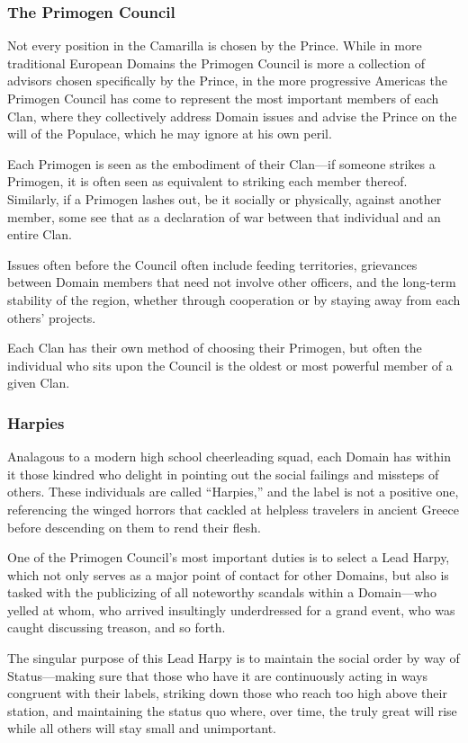\subsubsection{The Primogen Council}
Not every position in the Camarilla is chosen by the Prince.  While in more traditional 
European Domains the Primogen Council is more a collection of advisors chosen specifically 
by the Prince, in the more progressive Americas the Primogen Council has come to represent 
the most important members of each Clan, where they collectively address Domain issues and 
advise the Prince on the will of the Populace, which he may ignore at his own peril.

Each Primogen is seen as the embodiment of their Clan---if someone strikes a Primogen, it is 
often seen as equivalent to striking each member thereof.  Similarly, if a Primogen lashes out, 
be it socially or physically, against another member, some see that as a declaration of war 
between that individual and an entire Clan.

Issues often before the Council often include feeding territories, grievances between Domain 
members that need not involve other officers, and the long-term stability of the region, whether 
through cooperation or by staying away from each others' projects.

Each Clan has their own method of choosing their Primogen, but often the individual who sits 
upon the Council is the oldest or most powerful member of a given Clan.

\subsubsection{Harpies}
Analagous to a modern high school cheerleading squad, each Domain has within it those kindred 
who delight in pointing out the social failings and missteps of others.  These individuals are 
called ``Harpies,'' and the label is not a positive one, referencing the winged horrors that 
cackled at helpless travelers in ancient Greece before descending on them to rend their flesh.

One of the Primogen Council's most important duties is to select a Lead Harpy, which not only 
serves as a major point of contact for other Domains, but also is tasked with the publicizing of 
all noteworthy scandals within a Domain---who yelled at whom, who arrived insultingly underdressed 
for a grand event, who was caught discussing treason, and so forth.

The singular purpose of this Lead Harpy is to maintain the social order by way of Status---making 
sure that those who have it are continuously acting in ways congruent with their labels, striking 
down those who reach too high above their station, and maintaining the status quo where, over time, 
the truly great will rise while all others will stay small and unimportant.

